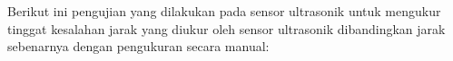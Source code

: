 Berikut ini pengujian yang dilakukan pada sensor ultrasonik untuk mengukur tinggat kesalahan jarak yang diukur oleh sensor ultrasonik dibandingkan jarak sebenarnya dengan pengukuran secara manual: \newline \newline

